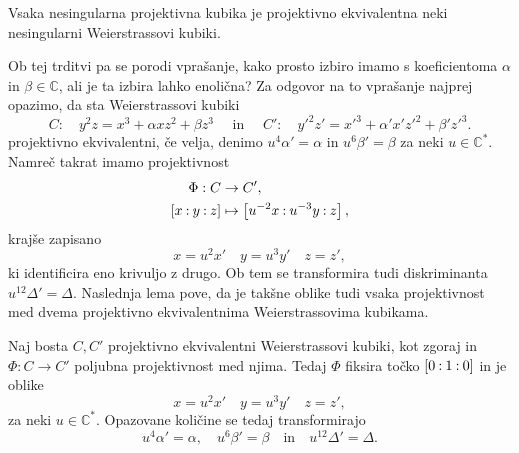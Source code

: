 \documentclass[mat1]{fmfdelo}
\numberwithin{equation}{section}
\newcommand{\C}{\mathbb C}
\newcommand{\CM}{\mathbb C ^*}
\newcommand{\pcoor}[1]{%
\begingroup\lccode`~=`: \lowercase{\endgroup
\edef~}{\mathbin{\mathchar\the\mathcode`:}\nobreak}%
\left[%
\begingroup
\mathcode`:=\string"8000
#1%
\endgroup
\right]%
}
\theoremstyle{definition}
\begin{document}

\begin{trditev}
    \label{kubika izomorfna neki wnf}
    Vsaka nesingularna projektivna kubika je projektivno ekvivalentna neki nesingularni Weierstrassovi kubiki.  
\end{trditev}

Ob tej trditvi pa se porodi vprašanje, kako prosto izbiro imamo s koeficientoma $\alpha$ in $\beta \in \C$, ali je ta izbira lahko enolična? Za odgovor na to vprašanje najprej opazimo, da sta Weierstrassovi kubiki 
\[
    C: \quad y^2z = x^3 + \alpha xz^2 + \beta z^3 \quad \text{ in } \quad
    C': \quad y'^2z' = x'^3 + \alpha' x'z'^2 + \beta' z'^3. 
\]
projektivno ekvivalentni, če velja, denimo $u^4 \alpha' = \alpha$ in $u^6 \beta' = \beta$ za neki $u \in \CM$. Namreč takrat imamo projektivnost
\begin{align*}
    \Phi:C &\to C',\\
    \pcoor{x : y : z} &\mapsto \pcoor{u^{-2}x : u^{-3}y : z},
\end{align*}
krajše zapisano 
\[
    x = u^2 x' \quad y = u^3 y' \quad z = z',  
\]
ki identificira eno krivuljo z drugo. Ob tem se transformira tudi diskriminanta $u^{12} \Delta' = \Delta$. Naslednja lema pove, da je takšne oblike tudi vsaka projektivnost med dvema projektivno ekvivalentnima Weierstrassovima kubikama. 
        
\begin{lema}
    \label{projektivnosti wnf}
    Naj bosta $C, C'$ projektivno ekvivalentni Weierstrassovi kubiki, kot zgoraj in $\Phi: C \to C'$ poljubna projektivnost med njima. Tedaj $\Phi$ fiksira točko $\pcoor{0 : 1 : 0}$ in je oblike
    \begin{equation}
        \label{eq:transformacija wnf}
        x = u^2 x' \quad y = u^3 y' \quad z = z',  
    \end{equation}
    za neki $u \in \CM$. Opazovane količine se tedaj transformirajo 
    \begin{equation}
        \label{eq:transformacija koeficientov in diskriminante}
        u^4 \alpha' = \alpha, \quad u^6 \beta' = \beta \quad \text{in} \quad u^{12} \Delta' = \Delta.
    \end{equation}
\end{lema}
\end{document}
